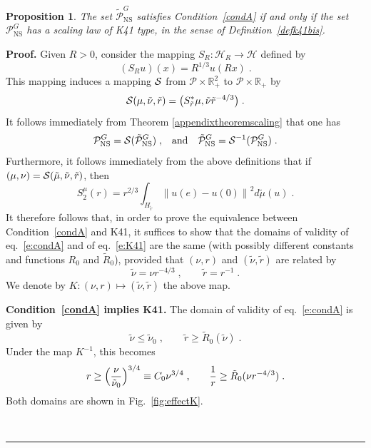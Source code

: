 \documentclass[11pt]{preprint}
\newtheorem{proposition}[theorem]{Proposition}
\newenvironment{proof}[1][Proof]{\textbf{#1.} }{\ \rule{0.5em}{0.5em}}
\begin{document}
\begin{proposition}
\label{mainprop} The set $\tilde{\mathcal{P}}_{{\mathrm{NS}}}^{G}$ satisfies
Condition~\ref{condA} if and only if the set $\mathcal{P}_{{\mathrm{NS}}}^{G}$ has a
scaling law of K41 type, in the sense of Definition~\ref{defk41bis}.
\end{proposition}

\begin{proof}
Given $R>0$, consider the mapping $S_{R}\colon\mathcal{H}_{R}\rightarrow
\mathcal{H}$ defined by
\begin{equation}
(S_{R}u)(x)=R^{1/3}u(Rx)\;.
\end{equation}
This mapping induces a mapping ${\CS}$ from $\mathcal{P}\times\mathbb{R}_{+}^{2}$
to $\mathcal{P}\times\mathbb{R}_{+}$ by
\begin{equation}
{\CS}(\mu,\tilde{\nu},\tilde{r})=\bigl(S_{\tilde{r}}^{\ast}\mu,\tilde{\nu}%
\tilde{r}^{-4/3}\bigr)\;.
\end{equation}
It follows immediately from Theorem \ref{appendixtheoremscaling} that one has
\begin{equation}
\mathcal{P}_{{\mathrm{NS}}}^{G}={\CS}(\tilde{\mathcal{P}}_{{\mathrm{NS}}}%
^{G})\;,\quad\hbox{and}\quad\tilde{\mathcal{P}}_{{\mathrm{NS}}}^{G}={\CS}%
^{-1}(\mathcal{P}_{{\mathrm{NS}}}^{G})\;.
\end{equation}
Furthermore, it follows immediately from the above definitions that if
$(\mu,\nu)={\CS}(\tilde{\mu},\tilde{\nu},\tilde{r})$, then
\begin{equation}
S_{2}^{\mu}(r)=r^{2/3}\int_{H_{\tilde{r}}}\left\|  u\left(  e\right)
-u(0)\right\|  ^{2}d\tilde{\mu}\left(  u\right)  \;.
\end{equation}
It therefore follows that, in order to prove the equivalence between
Condition~\ref{condA} and K41, it suffices to show that the domains of validity of eq.~\ref{e:condA}
and of eq.~\ref{e:K41} are the same (with possibly different constants and
functions $R_{0}$ and $\tilde{R}_{0}$), provided that $(\nu,r)$ and
$(\tilde{\nu},\tilde{r})$ are related by
\begin{equation}
\tilde{\nu}=\nu r^{-4/3}\;,\qquad\tilde{r}=r^{-1}\;.\label{e:relnur}%
\end{equation}
We denote by $K\colon(\nu,r)\mapsto(\tilde{\nu},\tilde{r})$ the above map.

\medskip
\noindent\textbf{Condition~\ref{condA} implies K41.} The domain of validity of
eq.~\ref{e:condA} is given by
\begin{equation}
\tilde{\nu}\leq\tilde{\nu}_{0}\;,\qquad\tilde{r}\geq\tilde{R}_{0}(\tilde{\nu
})\;.
\end{equation}
Under the map $K^{-1}$, this becomes
\begin{equation}
r\geq\Bigl({\frac{\nu}{\tilde{\nu}_{0}}}\Bigr)^{3/4}\equiv C_{0}\nu
^{3/4}\;,\qquad{\frac{1}{r}}\geq\tilde{R}_{0}(\nu r^{-4/3}%
)\;.\label{e:imcondA}%
\end{equation}
Both domains are shown in Fig.~\ref{fig:effectK}.


\end{proof}
\end{document}
